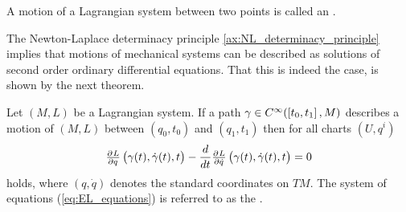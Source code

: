 \begin{definition}[Extremal]
	A motion of a Lagrangian system between two points is called an .
\end{definition}

The Newton-Laplace determinacy principle \ref{ax:NL_determinacy_principle} implies that motions of mechanical systems can be described as solutions of second order ordinary differential equations. That this is indeed the case, is shown by the next theorem.

\begin{theorem}
	\label{thm:EL_equations}
	Let $(M,L)$ be a Lagrangian system. If a path $\gamma \in C^\infty(\intcc[0]{t_0,t_1},M)$ describes a motion of $(M,L)$ between $(q_0,t_0)$ and $(q_1,t_1)$ then for all charts $(U,q^i)$
	\begin{equation}
		\label{eq:EL_equations}
		\pd{L}{q}\del[1]{\gamma(t),\dot{\gamma}(t),t} - \frac{d}{dt} \pd{L}{\dot{q}}\del[1]{\gamma(t),\dot{\gamma}(t),t} = 0
	\end{equation}
	\noindent holds, where $(q,\dot{q})$ denotes the standard coordinates on $TM$. The system of equations \textup{(}\ref{eq:EL_equations}\textup{)} is referred to as the .
\end{theorem}


